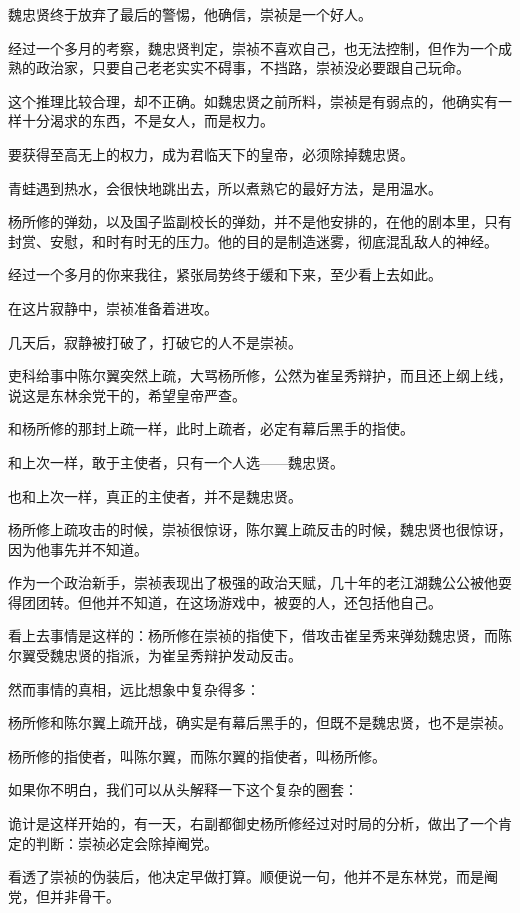 \begin{multicols}{\theparacolNo}
		魏忠贤终于放弃了最后的警惕，他确信，崇祯是一个好人。

		经过一个多月的考察，魏忠贤判定，崇祯不喜欢自己，也无法控制，但作为一个成熟的政治家，只要自己老老实实不碍事，不挡路，崇祯没必要跟自己玩命。

		这个推理比较合理，却不正确。如魏忠贤之前所料，崇祯是有弱点的，他确实有一样十分渴求的东西，不是女人，而是权力。

		要获得至高无上的权力，成为君临天下的皇帝，必须除掉魏忠贤。

		青蛙遇到热水，会很快地跳出去，所以煮熟它的最好方法，是用温水。

		杨所修的弹劾，以及国子监副校长的弹劾，并不是他安排的，在他的剧本里，只有封赏、安慰，和时有时无的压力。他的目的是制造迷雾，彻底混乱敌人的神经。

		经过一个多月的你来我往，紧张局势终于缓和下来，至少看上去如此。

		在这片寂静中，崇祯准备着进攻。

		几天后，寂静被打破了，打破它的人不是崇祯。

		吏科给事中陈尔翼突然上疏，大骂杨所修，公然为崔呈秀辩护，而且还上纲上线，说这是东林余党干的，希望皇帝严查。

		和杨所修的那封上疏一样，此时上疏者，必定有幕后黑手的指使。

		和上次一样，敢于主使者，只有一个人选——魏忠贤。

		也和上次一样，真正的主使者，并不是魏忠贤。

		杨所修上疏攻击的时候，崇祯很惊讶，陈尔翼上疏反击的时候，魏忠贤也很惊讶，因为他事先并不知道。

		作为一个政治新手，崇祯表现出了极强的政治天赋，几十年的老江湖魏公公被他耍得团团转。但他并不知道，在这场游戏中，被耍的人，还包括他自己。

		看上去事情是这样的：杨所修在崇祯的指使下，借攻击崔呈秀来弹劾魏忠贤，而陈尔翼受魏忠贤的指派，为崔呈秀辩护发动反击。

		然而事情的真相，远比想象中复杂得多：

		杨所修和陈尔翼上疏开战，确实是有幕后黑手的，但既不是魏忠贤，也不是崇祯。

		杨所修的指使者，叫陈尔翼，而陈尔翼的指使者，叫杨所修。

		如果你不明白，我们可以从头解释一下这个复杂的圈套：

		诡计是这样开始的，有一天，右副都御史杨所修经过对时局的分析，做出了一个肯定的判断：崇祯必定会除掉阉党。

		看透了崇祯的伪装后，他决定早做打算。顺便说一句，他并不是东林党，而是阉党，但并非骨干。


\end{multicols}
